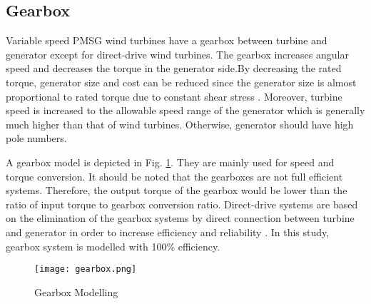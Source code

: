 \subsection{Gearbox}  
Variable speed PMSG wind turbines have a gearbox between turbine and generator except for direct-drive wind turbines. The gearbox increases angular speed and decreases the torque in the generator side.By decreasing the rated torque, generator size and cost can be reduced since the generator size is almost proportional to rated torque due to constant shear stress \cite{Polinder2013aa}. Moreover, turbine speed is increased to the allowable speed range of the generator which is generally much higher than that of wind turbines. Otherwise, generator should have high pole numbers. \par
A gearbox model is depicted in Fig. \ref{gearboxmodel}. They are mainly used for speed and torque conversion. It should be noted that the gearboxes are not full efficient systems. Therefore, the output torque of the gearbox would be lower than the ratio of input torque to gearbox conversion ratio. Direct-drive systems are based on the elimination of the gearbox systems by direct connection between turbine and generator in order to increase efficiency and reliability \cite{Chen2009b}. In this study, gearbox system is modelled with 100\% efficiency. 
\begin{figure}[h!]
	\centering
	\texttt{[image: gearbox.png]}
	\caption{Gearbox Modelling}
	\label{gearboxmodel}
\end{figure}

